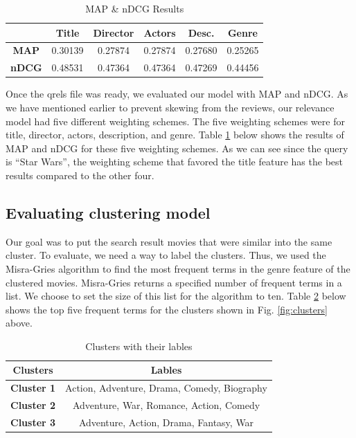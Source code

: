 \documentclass[sigconf]{acmart}
\begin{document}
\begin{center}
  \begin{table}[h]
    \caption{\label{tab:table1} MAP \& nDCG Results}
  \begin{tabular}{||c || c | c | c | c | c ||}
    \hline
     & \textbf{Title} & \textbf{Director} & \textbf{Actors} & \textbf{Desc.} & \textbf{Genre} \\ [0.5ex] 
    \hline\hline
    \textbf{MAP} & 0.30139 & 0.27874 & 0.27874 & 0.27680 & 0.25265\\ [0.5ex]
    \hline
    \textbf{nDCG} & 0.48531 & 0.47364 & 0.47364 & 0.47269 & 0.44456 \\ [0.5ex] 
    \hline
  \end{tabular}
  \end{table}
\end{center}

Once the qrels file was ready, we evaluated our model with MAP and nDCG. As we have mentioned earlier to prevent skewing from the reviews, our relevance model had five different weighting schemes. The five weighting schemes were for title, director, actors, description, and genre. Table \ref{tab:table1} below shows the results of MAP and nDCG for these five weighting schemes. As we can see since the query is ``Star Wars'', the weighting scheme that favored the title feature has the best results compared to the other four.

\subsection{Evaluating clustering model}
Our goal was to put the search result movies that were similar into the same cluster. To evaluate, we need a way to label the clusters. Thus, we used the Misra-Gries algorithm to find the most frequent terms in the genre feature of the clustered movies. Misra-Gries returns a specified number of frequent terms in a list. We choose to set the size of this list for the algorithm to ten. Table \ref{tab:table2} below shows the top five frequent terms for the clusters shown in Fig. \ref{fig:clusters} above.

\begin{center}
  \begin{table}[h]
    \caption{\label{tab:table2} Clusters with their lables}
  \begin{tabular}{||c || c ||}
    \hline
    \textbf{Clusters} & \textbf{Lables} \\ [0.5ex] 
    \hline\hline
    \textbf{Cluster 1} & Action, Adventure, Drama, Comedy, Biography \\ [0.5ex]
    \hline
    \textbf{Cluster 2} & Adventure, War, Romance, Action, Comedy \\ [0.5ex] 
    \hline
    \textbf{Cluster 3} & Adventure, Action, Drama, Fantasy, War \\ [0.5ex] 
    \hline
  \end{tabular}
  \end{table}
\end{center}
\end{document}
